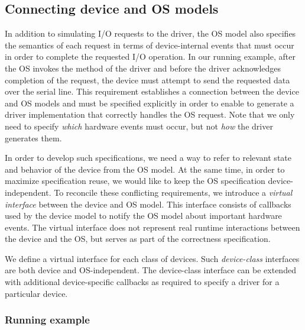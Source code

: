 \subsection{Connecting device and OS models}\label{s:virt}

In addition to simulating I/O requests to the driver, the OS model also specifies the semantics of each request in terms of device-internal events that must occur in order to complete the requested I/O operation.  In our running example, after the OS invokes the  method of the driver and before the driver acknowledges completion of the request, the device must attempt to send the requested data over the serial line.  This requirement establishes a connection between the device and OS models and must be specified explicitly in order to enable \termite to generate a driver implementation that correctly handles the OS request.  Note that we only need to specify \emph{which} hardware events must occur, but not \emph{how} the driver generates them.

In order to develop such specifications, we need a way to refer to relevant state and behavior of the device from the OS model.  At the same time, in order to maximize specification reuse, we would like to keep the OS specification device-independent.  To reconcile these conflicting requirements, we introduce a \emph{virtual interface} between the device and OS model.  This interface consists of callbacks used by the device model to notify the OS model about important hardware events.  The virtual interface does not represent real runtime interactions between the device and the OS, but serves as part of the correctness specification.

We define a virtual interface for each class of devices.  Such \emph{device-class} interfaces are both device and OS-independent.  The device-class interface can be extended with additional device-specific callbacks as required to specify a driver for a particular device.

\subsubsection{Running example}

